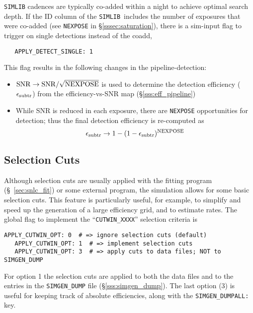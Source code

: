\documentclass[12pt]{article}
\newcommand{\simlib}{{\tt SIMLIB}}
\newcommand{\simeffsub}{\epsilon_{\rm subtr}}
\begin{document}
{{\simlib} cadences are typically co-added within a night to achieve
optimal search depth. If the ID column of the \simlib\ includes
the number of exposures that were co-added 
(see {\tt NEXPOSE} in \S\ref{sssec:saturation}),
there is a sim-input flag to trigger on single detections instead
of the coadd,
\begin{verbatim}
   APPLY_DETECT_SINGLE: 1
\end{verbatim}
This flag results in the following changes in the pipeline-detection:
\begin{itemize}
   \item ${\rm SNR} \to {\rm SNR}/\sqrt{\rm NEXPOSE}$ is used to
      determine the detection efficiency ($\simeffsub$) 
      from the efficiency-vs-SNR map
      (\S\ref{sss:eff_pipeline})
   \item While SNR is reduced in each exposure, there are {\tt NEXPOSE}
      opportunities for detection; thus the final detection efficiency
      is re-computed as
  \begin{equation}
     \simeffsub \to 1 - (1-\simeffsub)^{\rm NEXPOSE}
  \end{equation}
\end{itemize}


   \clearpage
   \subsection{Selection Cuts }
   \label{subsec:simcuts}

Although selection cuts are usually applied with the
fitting program (\S~\ref{sec:snlc_fit}) 
or some external program, the simulation
allows for some basic selection cuts. This feature
is particularly useful, for example, to simplify and 
speed up the generation of a large efficiency grid,
and to estimate rates.
The global flag to implement the ``{\tt CUTWIN\_XXXX}'' 
selection criteria is
%
\begin{Verbatim}[frame=single]
   APPLY_CUTWIN_OPT: 0  # => ignore selection cuts (default)
   APPLY_CUTWIN_OPT: 1  # => implement selection cuts 
   APPLY_CUTWIN_OPT: 3  # => apply cuts to data files; NOT to SIMGEN_DUMP
\end{Verbatim}
%
For option 1 the selection cuts are applied to both the data files
and to the entries in the {\tt SIMGEN\_DUMP} file
(\S\ref{sss:simgen_dump}).
The last option (3) is useful for keeping track of absolute
efficiencies, along with the {\tt SIMGEN\_DUMPALL:} key.
%

}
\end{document}
